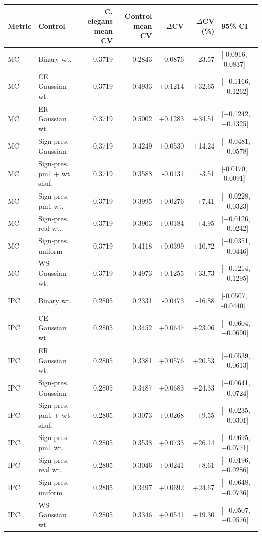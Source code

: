 \begin{tabular}{llrrrrl}
\toprule
Metric & Control & C. elegans mean CV & Control mean CV & $\Delta$CV & $\Delta$CV (\%) & 95\% CI \\
\midrule
MC & Binary wt. & 0.3719 & 0.2843 & -0.0876 & -23.57 & [-0.0916, -0.0837] \\
MC & CE Gaussian wt. & 0.3719 & 0.4933 & +0.1214 & +32.65 & [+0.1166, +0.1262] \\
MC & ER Gaussian wt. & 0.3719 & 0.5002 & +0.1283 & +34.51 & [+0.1242, +0.1325] \\
MC & Sign-pres. Gaussian & 0.3719 & 0.4249 & +0.0530 & +14.24 & [+0.0481, +0.0578] \\
MC & Sign-pres. pm1 + wt. shuf. & 0.3719 & 0.3588 & -0.0131 & -3.51 & [-0.0170, -0.0091] \\
MC & Sign-pres. pm1 wt. & 0.3719 & 0.3995 & +0.0276 & +7.41 & [+0.0228, +0.0323] \\
MC & Sign-pres. real wt. & 0.3719 & 0.3903 & +0.0184 & +4.95 & [+0.0126, +0.0242] \\
MC & Sign-pres. uniform & 0.3719 & 0.4118 & +0.0399 & +10.72 & [+0.0351, +0.0446] \\
MC & WS Gaussian wt. & 0.3719 & 0.4973 & +0.1255 & +33.73 & [+0.1214, +0.1295] \\
IPC & Binary wt. & 0.2805 & 0.2331 & -0.0473 & -16.88 & [-0.0507, -0.0440] \\
IPC & CE Gaussian wt. & 0.2805 & 0.3452 & +0.0647 & +23.06 & [+0.0604, +0.0690] \\
IPC & ER Gaussian wt. & 0.2805 & 0.3381 & +0.0576 & +20.53 & [+0.0539, +0.0613] \\
IPC & Sign-pres. Gaussian & 0.2805 & 0.3487 & +0.0683 & +24.33 & [+0.0641, +0.0724] \\
IPC & Sign-pres. pm1 + wt. shuf. & 0.2805 & 0.3073 & +0.0268 & +9.55 & [+0.0235, +0.0301] \\
IPC & Sign-pres. pm1 wt. & 0.2805 & 0.3538 & +0.0733 & +26.14 & [+0.0695, +0.0771] \\
IPC & Sign-pres. real wt. & 0.2805 & 0.3046 & +0.0241 & +8.61 & [+0.0196, +0.0286] \\
IPC & Sign-pres. uniform & 0.2805 & 0.3497 & +0.0692 & +24.67 & [+0.0648, +0.0736] \\
IPC & WS Gaussian wt. & 0.2805 & 0.3346 & +0.0541 & +19.30 & [+0.0507, +0.0576] \\
\bottomrule
\end{tabular}
